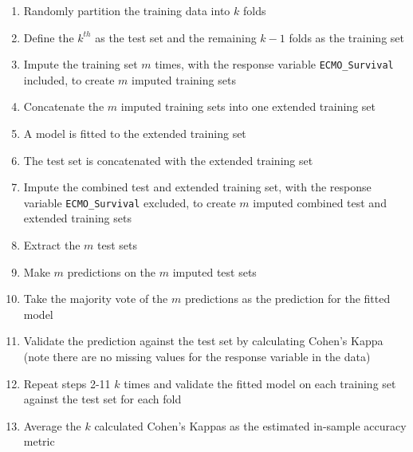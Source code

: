 \documentclass[12pt,]{article}
\providecommand{\tightlist}{%
  \setlength{\itemsep}{0pt}\setlength{\parskip}{0pt}}
\begin{document}
\begin{enumerate}
\def\labelenumi{\arabic{enumi}.}
\tightlist
\item
  Randomly partition the training data into \(k\) folds
\item
  Define the \(k^{th}\) as the test set and the remaining \(k-1\) folds
  as the training set
\item
  Impute the training set \(m\) times, with the response variable
  \texttt{ECMO\_Survival} included, to create \(m\) imputed training
  sets
\item
  Concatenate the \(m\) imputed training sets into one extended training
  set
\item
  A model is fitted to the extended training set
\item
  The test set is concatenated with the extended training set
\item
  Impute the combined test and extended training set, with the response
  variable \texttt{ECMO\_Survival} excluded, to create \(m\) imputed
  combined test and extended training sets
\item
  Extract the \(m\) test sets
\item
  Make \(m\) predictions on the \(m\) imputed test sets
\item
  Take the majority vote of the \(m\) predictions as the prediction for
  the fitted model
\item
  Validate the prediction against the test set by calculating Cohen's
  Kappa (note there are no missing values for the response variable in
  the data)
\item
  Repeat steps 2-11 \(k\) times and validate the fitted model on each
  training set against the test set for each fold
\item
  Average the \(k\) calculated Cohen's Kappas as the estimated in-sample
  accuracy metric
\end{enumerate}
\end{document}
